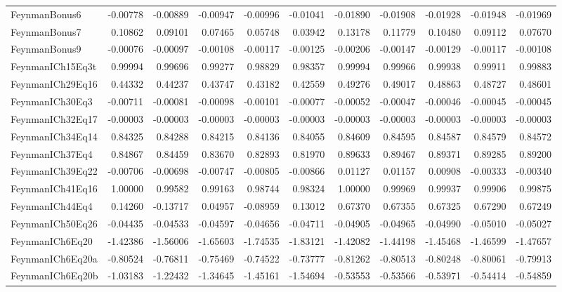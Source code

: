 \begin{tabular}{lrrrrrrrrrr}
FeynmanBonus6 & -0.00778 & -0.00889 & -0.00947 & -0.00996 & -0.01041 & -0.01890 & -0.01908 & -0.01928 & -0.01948 & -0.01969 \\
FeynmanBonus7 & 0.10862 & 0.09101 & 0.07465 & 0.05748 & 0.03942 & 0.13178 & 0.11779 & 0.10480 & 0.09112 & 0.07670 \\
FeynmanBonus9 & -0.00076 & -0.00097 & -0.00108 & -0.00117 & -0.00125 & -0.00206 & -0.00147 & -0.00129 & -0.00117 & -0.00108 \\
FeynmanICh15Eq3t & 0.99994 & 0.99696 & 0.99277 & 0.98829 & 0.98357 & 0.99994 & 0.99966 & 0.99938 & 0.99911 & 0.99883 \\
FeynmanICh29Eq16 & 0.44332 & 0.44237 & 0.43747 & 0.43182 & 0.42559 & 0.49276 & 0.49017 & 0.48863 & 0.48727 & 0.48601 \\
FeynmanICh30Eq3 & -0.00711 & -0.00081 & -0.00098 & -0.00101 & -0.00077 & -0.00052 & -0.00047 & -0.00046 & -0.00045 & -0.00045 \\
FeynmanICh32Eq17 & -0.00003 & -0.00003 & -0.00003 & -0.00003 & -0.00003 & -0.00003 & -0.00003 & -0.00003 & -0.00003 & -0.00003 \\
FeynmanICh34Eq14 & 0.84325 & 0.84288 & 0.84215 & 0.84136 & 0.84055 & 0.84609 & 0.84595 & 0.84587 & 0.84579 & 0.84572 \\
FeynmanICh37Eq4 & 0.84867 & 0.84459 & 0.83670 & 0.82893 & 0.81970 & 0.89633 & 0.89467 & 0.89371 & 0.89285 & 0.89200 \\
FeynmanICh39Eq22 & -0.00706 & -0.00698 & -0.00747 & -0.00805 & -0.00866 & 0.01127 & 0.01157 & 0.00908 & -0.00333 & -0.00340 \\
FeynmanICh41Eq16 & 1.00000 & 0.99582 & 0.99163 & 0.98744 & 0.98324 & 1.00000 & 0.99969 & 0.99937 & 0.99906 & 0.99875 \\
FeynmanICh44Eq4 & 0.14260 & -0.13717 & 0.04957 & -0.08959 & 0.13012 & 0.67370 & 0.67355 & 0.67325 & 0.67290 & 0.67249 \\
FeynmanICh50Eq26 & -0.04435 & -0.04533 & -0.04597 & -0.04656 & -0.04711 & -0.04905 & -0.04965 & -0.04990 & -0.05010 & -0.05027 \\
FeynmanICh6Eq20 & -1.42386 & -1.56006 & -1.65603 & -1.74535 & -1.83121 & -1.42082 & -1.44198 & -1.45468 & -1.46599 & -1.47657 \\
FeynmanICh6Eq20a & -0.80524 & -0.76811 & -0.75469 & -0.74522 & -0.73777 & -0.81262 & -0.80513 & -0.80248 & -0.80061 & -0.79913 \\
FeynmanICh6Eq20b & -1.03183 & -1.22432 & -1.34645 & -1.45161 & -1.54694 & -0.53553 & -0.53566 & -0.53971 & -0.54414 & -0.54859 \\

\end{tabular}
